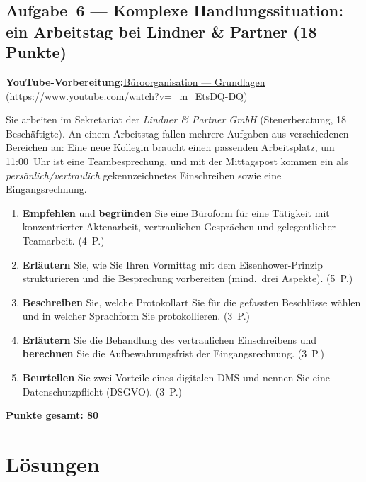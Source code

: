 \documentclass[11pt, a4paper]{article}
\begin{document}
\subsection*{Aufgabe~6 --- Komplexe Handlungssituation: ein Arbeitstag bei Lindner \& Partner (18 Punkte)}

\noindent\textbf{\color{bfwAccent}YouTube-Vorbereitung:}\enspace \href{https://www.youtube.com/watch?v=_m_EtsDQ-DQ}{Büroorganisation --- Grundlagen} (\url{https://www.youtube.com/watch?v=_m_EtsDQ-DQ})

\medskip
Sie arbeiten im Sekretariat der \emph{Lindner \& Partner GmbH} (Steuerberatung, 18 Beschäftigte).
An einem Arbeitstag fallen mehrere Aufgaben aus verschiedenen Bereichen an: Eine neue
Kollegin braucht einen passenden Arbeitsplatz, um 11:00~Uhr ist eine Teambesprechung,
und mit der Mittagspost kommen ein als \emph{persönlich/vertraulich} gekennzeichnetes
Einschreiben sowie eine Eingangsrechnung.

\begin{enumerate}[label=(\alph*)]
  \item \textbf{Empfehlen} und \textbf{begründen} Sie eine Büroform für eine Tätigkeit mit konzentrierter Aktenarbeit, vertraulichen Gesprächen und gelegentlicher Teamarbeit. \hfill (4~P.)
  \item \textbf{Erläutern} Sie, wie Sie Ihren Vormittag mit dem Eisenhower-Prinzip strukturieren und die Besprechung vorbereiten (mind.\ drei Aspekte). \hfill (5~P.)
  \item \textbf{Beschreiben} Sie, welche Protokollart Sie für die gefassten Beschlüsse wählen und in welcher Sprachform Sie protokollieren. \hfill (3~P.)
  \item \textbf{Erläutern} Sie die Behandlung des vertraulichen Einschreibens und \textbf{berechnen} Sie die Aufbewahrungsfrist der Eingangsrechnung. \hfill (3~P.)
  \item \textbf{Beurteilen} Sie zwei Vorteile eines digitalen DMS und nennen Sie eine Datenschutzpflicht (DSGVO). \hfill (3~P.)
\end{enumerate}

\vspace{1em}
\noindent\textbf{Punkte gesamt: 80}

\newpage

\section{Lösungen}\label{loesungen}
\end{document}
